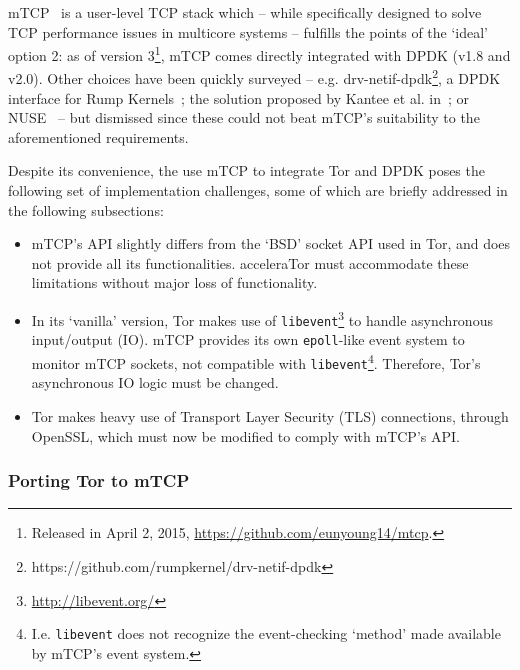 \documentclass[conference]{IEEEtran}
\begin{document}
mTCP~\cite{179773} is a user-level TCP stack which -- while specifically 
designed to solve TCP performance issues in multicore systems -- fulfills the 
points of the `ideal' option 2: as of version 3\footnote{Released in 
April 2, 2015, \url{https://github.com/eunyoung14/mtcp}.}, mTCP comes directly 
integrated with DPDK (v1.8 and v2.0). Other choices have been quickly 
surveyed -- e.g. drv-netif-dpdk\footnote{https://github.com/rumpkernel/drv-netif-dpdk}, a 
DPDK interface for Rump Kernels~\cite{Rump2015}; the solution proposed by Kantee 
et al. in~\cite{Kantee2009}; or NUSE~\cite{Nuse2015} -- but dismissed since these 
could not beat mTCP's suitability to the aforementioned requirements.

Despite its convenience, the use mTCP to integrate Tor and DPDK poses the 
following set of implementation challenges, some of which are briefly addressed 
in the following subsections:

\begin{itemize}
	\item mTCP's API slightly differs from the `BSD' socket API used in Tor, and 
		does not provide all its functionalities. acceleraTor must accommodate 
		these limitations without major loss of functionality.
	\item In its `vanilla' version, Tor makes use 
		of \verb+libevent+\footnote{\url{http://libevent.org/}} to handle 
		asynchronous input\slash output (IO). mTCP provides 
		its own \verb+epoll+-like event system to monitor mTCP sockets, not 
		compatible with \verb+libevent+\cprotect\footnote{I.e. \verb+libevent+ does not 
		recognize the event-checking `method' made available 
		by mTCP's event system.}. Therefore, Tor's asynchronous IO logic must 
		be changed.
	\item Tor makes heavy use of Transport Layer Security (TLS) connections, 
		through OpenSSL, which must 
		now be modified to comply with mTCP's API.
\end{itemize}

\subsubsection{Porting Tor to mTCP}
\label{subsubsec:design-mtcp-port}
\end{document}
